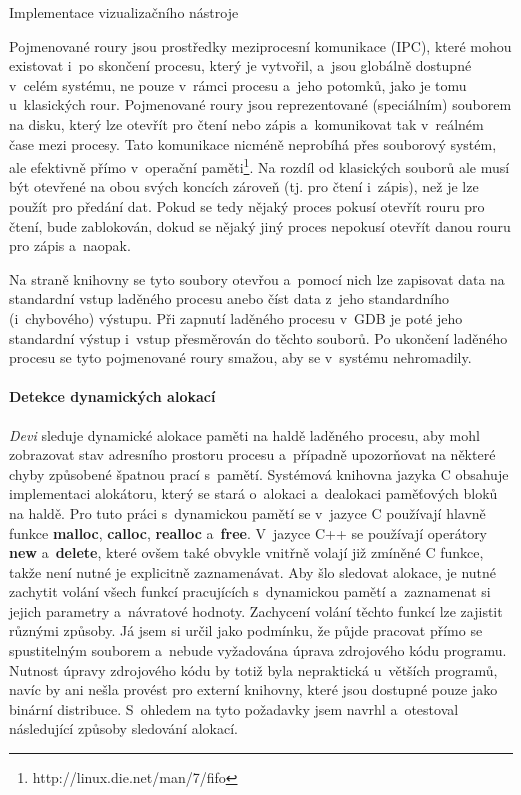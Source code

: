 \documentclass[czech,bachelor,male,python,dept460,hidelinks]{diploma}						%
\newcommand{\parspace}[1][]{
	\ifthenelse{\isempty{#1}}{\vspace{0mm}}{\vspace{#1}}
	\par
}
\begin{document}
\begin{section}{Implementace vizualizačního nástroje}
			\parspace Pojmenované roury jsou prostředky meziprocesní komunikace (IPC), které mohou existovat i~po skončení procesu, který je vytvořil, a~jsou globálně
			dostupné v~celém systému, ne pouze v~rámci procesu a~jeho potomků, jako je tomu u~klasických rour. Pojmenované roury jsou reprezentované (speciálním)
			souborem na disku, který lze otevřít pro čtení nebo zápis a~komunikovat tak v~reálném čase mezi procesy. Tato komunikace nicméně neprobíhá 
			přes souborový systém, ale efektivně přímo v~operační paměti\footnote{http://linux.die.net/man/7/fifo}.
			Na rozdíl od klasických souborů ale musí být otevřené na obou svých koncích zároveň (tj. pro čtení i~zápis), než je lze použít pro předání dat.
			Pokud se tedy nějaký proces pokusí otevřít rouru pro čtení, bude zablokován, dokud se nějaký jiný proces nepokusí otevřít danou
			rouru pro zápis a~naopak.
			
			
			\parspace Na straně knihovny se tyto soubory otevřou a~pomocí nich lze zapisovat data na standardní vstup laděného procesu anebo číst data z~jeho
			standardního (i~chybového) výstupu. Při zapnutí laděného procesu v~GDB je poté jeho standardní výstup i~vstup přesměrován do těchto souborů.
			Po ukončení laděného procesu se tyto pojmenované roury smažou, aby se v~systému nehromadily.
			
			
		\paragraph*{Detekce dynamických alokací}
			\textit{Devi} sleduje dynamické alokace paměti na haldě laděného procesu, aby mohl zobrazovat stav adresního prostoru procesu a~případně upozorňovat na
			některé chyby způsobené špatnou prací s~pamětí. Systémová knihovna jazyka C obsahuje implementaci alokátoru, který se stará o~alokaci a~dealokaci paměťových
			bloků na haldě. Pro tuto práci s~dynamickou pamětí se v~jazyce C používají hlavně funkce \textbf{malloc}, \textbf{calloc}, \textbf{realloc}
			a~\textbf{free}. V~jazyce C++ se používají operátory \textbf{new} a~\textbf{delete}, které ovšem také obvykle vnitřně volají již zmíněné C funkce,
			takže není nutné je explicitně zaznamenávat. Aby šlo sledovat alokace, je nutné zachytit volání všech funkcí pracujících s~dynamickou pamětí a~zaznamenat si
			jejich parametry a~návratové hodnoty. Zachycení volání těchto funkcí lze zajistit různými způsoby. Já jsem si určil jako podmínku, že půjde pracovat
			přímo se spustitelným souborem a~nebude vyžadována úprava zdrojového kódu programu.
			Nutnost úpravy zdrojového kódu by totiž byla nepraktická u~větších programů, navíc by ani nešla provést pro externí knihovny, které jsou dostupné pouze
			jako binární distribuce.
			S~ohledem na tyto požadavky jsem navrhl a~otestoval následující způsoby sledování alokací.

\end{section}
\end{document}
